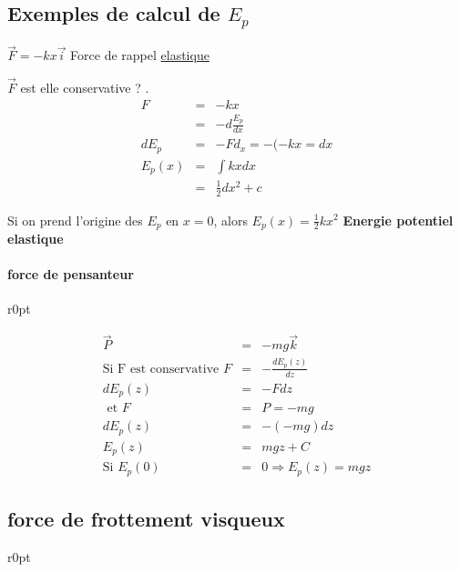 \subsection{Exemples de calcul de $E_p$}

$\vec{F} =-kx\vec{i}$ Force de rappel \ul{elastique}

$\vec{F}$ est elle conservative ? .
\[\begin{array}{rcl}
F &=& -kx \\
&=& -d\frac{E_p}{dx} \\
dE_p &=& -Fd_x = -(-kx=dx \\
E_p(x) &=& \int kxdx \\
&=& \frac{1}{2}dx^2 + c\end{array}\]

Si on prend l'origine des $E_p$ en $x=0$, alors $E_p(x) = \frac{1}{2}kx^2$ \textbf{Energie potentiel elastique}

\paragraph{force de pensanteur}

\begin{wrapfigure}[6]{r}{0pt}
\end{wrapfigure}

\[\begin{array}{rcl}
\vec{P} &=& -mg\vec{k} \\
\text{Si F est conservative } F &=& -\frac{dE_p(z)}{dz} \\
dE_p(z) &=& -Fdz \\
\text{ et } F &=& P = -mg \\
dE_p(z) &=& -(-mg)dz \\
E_p(z) &=& mgz + C \\
\text{Si } E_p(0) &=& 0 \Rightarrow E_p(z) = mgz\end{array}\]

\subsection{force de frottement visqueux}

\begin{wrapfigure}[5]{r}{0pt}

\end{wrapfigure}

